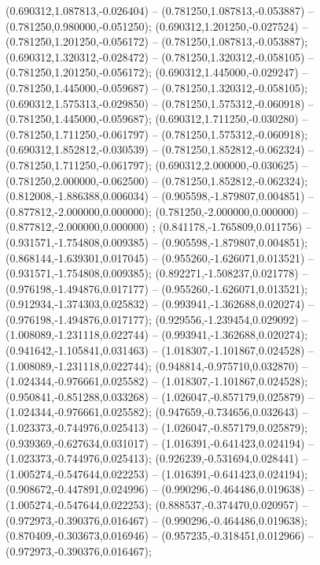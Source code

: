  (0.690312,1.087813,-0.026404) -- (0.781250,1.087813,-0.053887) -- (0.781250,0.980000,-0.051250);
 (0.690312,1.201250,-0.027524) -- (0.781250,1.201250,-0.056172) -- (0.781250,1.087813,-0.053887);
 (0.690312,1.320312,-0.028472) -- (0.781250,1.320312,-0.058105) -- (0.781250,1.201250,-0.056172);
 (0.690312,1.445000,-0.029247) -- (0.781250,1.445000,-0.059687) -- (0.781250,1.320312,-0.058105);
 (0.690312,1.575313,-0.029850) -- (0.781250,1.575312,-0.060918) -- (0.781250,1.445000,-0.059687);
 (0.690312,1.711250,-0.030280) -- (0.781250,1.711250,-0.061797) -- (0.781250,1.575312,-0.060918);
 (0.690312,1.852812,-0.030539) -- (0.781250,1.852812,-0.062324) -- (0.781250,1.711250,-0.061797);
 (0.690312,2.000000,-0.030625) -- (0.781250,2.000000,-0.062500) -- (0.781250,1.852812,-0.062324);
 (0.812008,-1.886388,0.006034) -- (0.905598,-1.879807,0.004851) -- (0.877812,-2.000000,0.000000);
 (0.781250,-2.000000,0.000000) -- (0.877812,-2.000000,0.000000) ;
 (0.841178,-1.765809,0.011756) -- (0.931571,-1.754808,0.009385) -- (0.905598,-1.879807,0.004851);
 (0.868144,-1.639301,0.017045) -- (0.955260,-1.626071,0.013521) -- (0.931571,-1.754808,0.009385);
 (0.892271,-1.508237,0.021778) -- (0.976198,-1.494876,0.017177) -- (0.955260,-1.626071,0.013521);
 (0.912934,-1.374303,0.025832) -- (0.993941,-1.362688,0.020274) -- (0.976198,-1.494876,0.017177);
 (0.929556,-1.239454,0.029092) -- (1.008089,-1.231118,0.022744) -- (0.993941,-1.362688,0.020274);
 (0.941642,-1.105841,0.031463) -- (1.018307,-1.101867,0.024528) -- (1.008089,-1.231118,0.022744);
 (0.948814,-0.975710,0.032870) -- (1.024344,-0.976661,0.025582) -- (1.018307,-1.101867,0.024528);
 (0.950841,-0.851288,0.033268) -- (1.026047,-0.857179,0.025879) -- (1.024344,-0.976661,0.025582);
 (0.947659,-0.734656,0.032643) -- (1.023373,-0.744976,0.025413) -- (1.026047,-0.857179,0.025879);
 (0.939369,-0.627634,0.031017) -- (1.016391,-0.641423,0.024194) -- (1.023373,-0.744976,0.025413);
 (0.926239,-0.531694,0.028441) -- (1.005274,-0.547644,0.022253) -- (1.016391,-0.641423,0.024194);
 (0.908672,-0.447891,0.024996) -- (0.990296,-0.464486,0.019638) -- (1.005274,-0.547644,0.022253);
 (0.888537,-0.374470,0.020957) -- (0.972973,-0.390376,0.016467) -- (0.990296,-0.464486,0.019638);
 (0.870409,-0.303673,0.016946) -- (0.957235,-0.318451,0.012966) -- (0.972973,-0.390376,0.016467);
